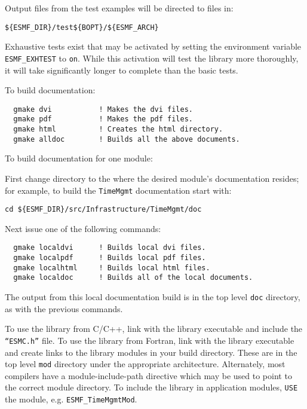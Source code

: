 Output files from the test examples will be directed to files in:
\begin{verbatim}
${ESMF_DIR}/test${BOPT}/${ESMF_ARCH}
\end{verbatim}

Exhaustive tests exist that may be activated by setting the environment variable
{\tt ESMF\_EXHTEST} to {\tt on}.  While this activation will test the library more thoroughly,
it will take significantly longer to complete than the basic tests.

\smallskip

\noindent To build documentation:
\begin{verbatim}
  gmake dvi           ! Makes the dvi files.
  gmake pdf           ! Makes the pdf files.
  gmake html          ! Creates the html directory.
  gmake alldoc        ! Builds all the above documents.
\end{verbatim}

\noindent To build documentation for one module:

\noindent First change directory to the where the desired module's documentation resides;  for
example, to build the {\tt TimeMgmt} documentation start with:

\begin{verbatim}
cd ${ESMF_DIR}/src/Infrastructure/TimeMgmt/doc
\end{verbatim}

\noindent Next issue one of the following commands:
\begin{verbatim}
  gmake localdvi      ! Builds local dvi files.
  gmake localpdf      ! Builds local pdf files.
  gmake localhtml     ! Builds local html files.
  gmake localdoc      ! Builds all of the local documents.
\end{verbatim}

\noindent The output from this local documentation build is in the top level {\tt doc}
directory, as with the previous commands.

\smallskip

To use the library from C/C++, link with the library executable and include
the {\tt ``ESMC.h''} file.
To use the library from Fortran, link with the library executable and
create links to the library modules in your build directory.  These are
in the top level {\tt mod} directory under the appropriate architecture.  Alternately, 
most compilers have a module-include-path directive which may be used to point
to the correct module directory.
To include the library in application modules, {\tt USE} the
module, e.g. {\tt ESMF\_TimeMgmtMod}.  

